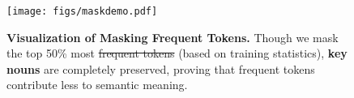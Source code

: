 \begin{figure}[t]

    \centering   \texttt{[image: figs/maskdemo.pdf]} 
    \vspace{-23pt} 
\caption{\textbf{Visualization of Masking Frequent Tokens.} 
Though we mask the top 50\% most \textcolor[rgb]{0.5,0.5,0.5}{\sout{frequent tokens}} (based on training statistics), \textcolor[rgb]{0.75,0.23,0.23}{\textbf{key nouns}} are completely preserved, proving that frequent tokens contribute less to semantic meaning.}
 \vspace{-18pt}   
 \label{fig:mask_exam}
\end{figure}
